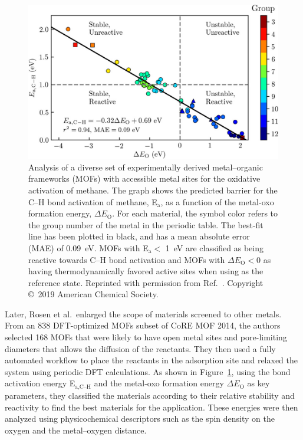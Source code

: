 \documentclass[main.tex]{subfiles}
\begin{document}
\begin{figure}[ht]
\centering
  \includegraphics[width=0.8\linewidth]{figures/1-screening/Rosen_2019.jpeg}
  \caption{Analysis of a diverse set of experimentally derived metal--organic frameworks (MOFs) with accessible metal sites for the oxidative activation of methane. The graph shows the predicted barrier for the C--H bond activation of methane, E$_\text{a}$, as a function of the metal-oxo formation energy, $\Delta E_\text{O}$. For each material, the symbol color refers to the group number of the metal in the periodic table. The best-fit line has been plotted in black, and has a mean absolute error (MAE) of \SI{0.09}{\eV}. MOFs with E$_\text{a}<$ \SI{1}{\eV} are classified as being reactive towards C--H bond activation and MOFs with $\Delta E_\text{O}<0$ as having thermodynamically favored active sites when using  as the reference state. Reprinted with permission from Ref.~\cite{Rosen_2019}. Copyright \copyright\  2019 American Chemical Society.}\label{fgr:Rosen_2019}
\end{figure}

Later, Rosen et al.\ enlarged the scope of materials screened to other metals.\autocite{Rosen_2019} From an 838 DFT-optimized MOFs subset of CoRE MOF 2014, the authors selected 168 MOFs that were likely to have open metal sites and pore-limiting diameters that allows the diffusion of the reactants. They then used a fully automated workflow to place the reactants in the adsorption site and relaxed the system using periodic DFT calculations. As shown in Figure~\ref{fgr:Rosen_2019}, using the bond activation energy E$_\text{a,C--H}$ and the metal-oxo formation energy $\Delta E_\text{O}$ as key parameters, they classified the materials according to their relative stability and reactivity to find the best materials for the application. These energies were then analyzed using physicochemical descriptors such as the spin density on the oxygen and the metal--oxygen distance.
\end{document}
